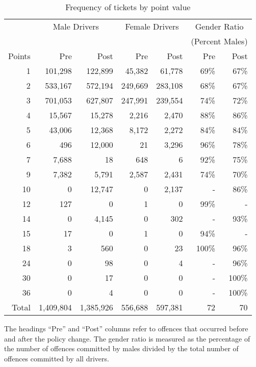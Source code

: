 
\begin{table}%
\centering
\begin{tabular}{r r r r r r r}
  \hline
		& \multicolumn{2}{c}{Male Drivers} 	&  \multicolumn{2}{c}{Female Drivers} &  \multicolumn{2}{c}{Gender Ratio} \\
 & & & & & \multicolumn{2}{c}{(Percent Males)} \\

 \cmidrule(lr){2-3}\cmidrule(lr){4-5}\cmidrule(lr){6-7} 
Points 	& Pre 		& Post		& Pre 		& Post		& Pre 		& Post		\\ 
  \hline
1 		& 101,298 	& 122,899	&  45,382 	&   61,778 	& 69\% 	& 67\% \\ 
2 		& 533,167 	& 572,194	& 249,669 	& 283,108 	& 68\% 	& 67\% \\ 
3 		& 701,053 	& 627,807	& 247,991	& 239,554	& 74\% 	& 72\% \\ 
4 		&  15,567 	&  15,278 	&    2,216 	&    2,470 	& 88\% 	& 86\% \\ 
5 		&  43,006 	&  12,368 	&    8,172 	&    2,272 	& 84\% 	& 84\% \\ 
6 		&     496 	&  12,000 	&        21 	&    3,296 	& 96\% 	& 78\% \\ 
7 		&   7,688 	&        18 	&      648 	&          6 	& 92\% 	& 75\% \\ 
9 		&   7,382 	&    5,791 	&    2,587 	&    2,431 	& 74\% 	& 70\% \\ 
10 		&         0 	&  12,747 	&         0 	&    2,137 	& -			& 86\% \\ 
12 		&     127	&         0 	&         1 	&         0 	& 99\% 	& - \\ 
14 		&       0 	&   4,145 	&         0 	&      302 	& -			& 93\% \\ 
15 		&      17 	&         0 	&         1 	&         0 	& 94\% 	& - \\ 
18 		&       3 	&      560 	&         0 	&        23 	& 100\% 	& 96\% \\ 
24 		&       0 	&       98 	&         0 	&         4 	& -			& 96\% \\ 
30 		&       0 	&       17 	&         0 	&         0 	& -			& 100\% \\ 
36 		&       0 	&        4 	&         0 	&         0 	& -			& 100\% \\ 

   \hline

Total 	  & 1,409,804 & 1,385,926 & 556,688 & 597,381 & 72 & 70 \\ 

   \hline
\end{tabular}
\caption{Frequency of tickets by point value} 
The headings ``Pre'' and ``Post'' columns refer to offences that occurred before and after the policy change. 
The gender ratio is measured as the percentage of the number of offences committed by males 
divided by the total number of offences committed by all drivers. 
\label{tab:point_freq}
\end{table}